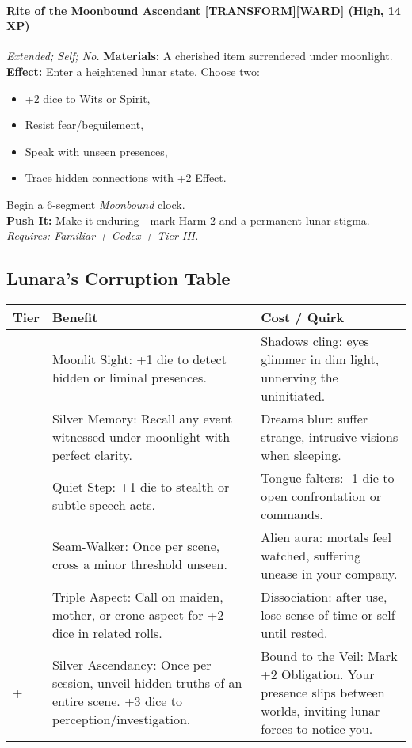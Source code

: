 \paragraph{Rite of the Moonbound Ascendant \textnormal{[TRANSFORM][WARD]} (High, 14 XP)}  
\emph{Extended; Self; No.}  
\textbf{Materials:} A cherished item surrendered under moonlight. \\  
\textbf{Effect:} Enter a heightened lunar state. Choose two:  
\begin{itemize}  
  \item +2 dice to Wits or Spirit,  
  \item Resist fear/beguilement,  
  \item Speak with unseen presences,  
  \item Trace hidden connections with +2 Effect.  
\end{itemize}  
Begin a 6-segment \emph{Moonbound} clock. \\  
\textbf{Push It:} Make it enduring—mark Harm 2 and a permanent lunar stigma. \\  
\emph{Requires: Familiar + Codex + Tier III.}

\subsection*{Lunara's Corruption Table}
\label{sec:lunara-corruption}

\begin{longtable}{>{\raggedright\arraybackslash}p{1cm} p{5cm} p{5cm}}
\toprule
\textbf{Tier} & \textbf{Benefit} & \textbf{Cost / Quirk} \\
\midrule
1 & Moonlit Sight: +1 die to detect hidden or liminal presences. & Shadows cling: eyes glimmer in dim light, unnerving the uninitiated. \\
\midrule
2 & Silver Memory: Recall any event witnessed under moonlight with perfect clarity. & Dreams blur: suffer strange, intrusive visions when sleeping. \\
\midrule
3 & Quiet Step: +1 die to stealth or subtle speech acts. & Tongue falters: -1 die to open confrontation or commands. \\
\midrule
4 & Seam-Walker: Once per scene, cross a minor threshold unseen. & Alien aura: mortals feel watched, suffering unease in your company. \\
\midrule
5 & Triple Aspect: Call on maiden, mother, or crone aspect for +2 dice in related rolls. & Dissociation: after use, lose sense of time or self until rested. \\
\midrule
6+ & Silver Ascendancy: Once per session, unveil hidden truths of an entire scene. +3 dice to perception/investigation. & Bound to the Veil: Mark +2 Obligation. Your presence slips between worlds, inviting lunar forces to notice you. \\
\bottomrule
\end{longtable}